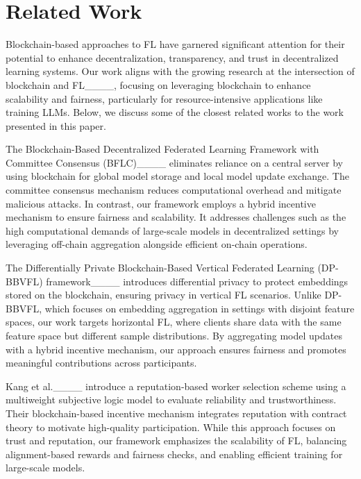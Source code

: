 \section{Related Work}
\label{sec:related_work}

Blockchain-based approaches to FL have garnered significant attention for their potential to enhance decentralization, transparency, and trust in decentralized learning systems. Our work aligns with the growing research at the intersection of blockchain and FL____, focusing on leveraging blockchain to enhance scalability and fairness, particularly for resource-intensive applications like training LLMs. Below, we discuss some of the closest related works to the work presented in this paper.


The Blockchain-Based Decentralized Federated Learning Framework with Committee Consensus (BFLC)____ eliminates reliance on a central server by using blockchain for global model storage and local model update exchange. The committee consensus mechanism reduces computational overhead and mitigate malicious attacks. In contrast, our framework employs a hybrid incentive mechanism to ensure fairness and scalability. It addresses challenges such as the high computational demands of large-scale models in decentralized settings by leveraging off-chain aggregation alongside efficient on-chain operations.


The Differentially Private Blockchain-Based Vertical Federated Learning (DP-BBVFL) framework____ introduces differential privacy to protect embeddings stored on the blockchain, ensuring privacy in vertical FL scenarios. Unlike DP-BBVFL, which focuses on embedding aggregation in settings with disjoint feature spaces, our work targets horizontal FL, where clients share data with the same feature space but different sample distributions. By aggregating model updates with a hybrid incentive mechanism, our approach ensures fairness and promotes meaningful contributions across participants.


Kang et al.____ introduce a reputation-based worker selection scheme using a multiweight subjective logic model to evaluate reliability and trustworthiness. Their blockchain-based incentive mechanism integrates reputation with contract theory to motivate high-quality participation. While this approach focuses on trust and reputation, our framework emphasizes the scalability of FL, balancing alignment-based rewards and fairness checks, and enabling efficient training for large-scale models.

